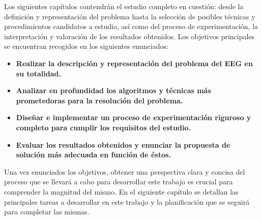 Los siguientes capítulos contendrán el estudio completo en cuestión: desde la definición y representación del problema hasta la selección de posibles técnicas y procedimientos candidatos a estudio, así como del proceso de experimentación, la interpretación y valoración de los resultados obtenidos. Los objetivos principales se encuentran recogidos en los siguientes enunciados:

\begin{itemize}
	\item \textbf{Realizar la descripción y representación del problema del EEG en su totalidad.}
	\item \textbf{Analizar en profundidad los algoritmos y técnicas más prometedoras para la resolución del problema.}
	\item \textbf{Diseñar e implementar un proceso de experimentación riguroso y completo para cumplir los requisitos del estudio.}
	\item \textbf{Evaluar los resultados obtenidos y enunciar la propuesta de solución más adecuada en función de éstos.}
\end{itemize}

Una vez enunciados los objetivos, obtener una perspectiva clara y concisa del proceso que se llevará a cabo para desarrollar este trabajo es crucial para comprender la magnitud del mismo. En el siguiente capítulo se detallan las principales tareas a desarrollar en este trabajo y la planificación que se seguirá para completar las mismas.

